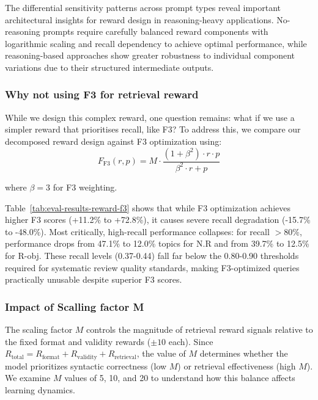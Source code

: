 The differential sensitivity patterns across prompt types reveal important architectural insights for reward design in reasoning-heavy applications. No-reasoning prompts require carefully balanced reward components with logarithmic scaling and recall dependency to achieve optimal performance, while reasoning-based approaches show greater robustness to individual component variations due to their structured intermediate outputs.


\subsubsection{Why not using F3 for retrieval reward}



While we design this complex reward, one question remains: what if we use a simpler reward that prioritises recall, like F3? To address this, we compare our decomposed reward design against F3 optimization using:
\[
F_{\text{F3}}(r, p)  = M \cdot \frac{(1 + \beta^2) \cdot r \cdot p}{\beta^2 \cdot r + p}
\]

where $\beta = 3$ for F3 weighting.

Table~\ref{tab:eval-results-reward-f3} shows that while F3 optimization achieves higher F3 scores (+11.2\% to +72.8\%), it causes severe recall degradation (-15.7\% to -48.0\%). Most critically, high-recall performance collapses: for recall $>80\%$, performance drops from 47.1\% to 12.0\% topics for N.R and from 39.7\% to 12.5\% for R-obj. These recall levels (0.37-0.44) fall far below the 0.80-0.90 thresholds required for systematic review quality standards, making F3-optimized queries practically unusable despite superior F3 scores.

\subsubsection{Impact of Scalling factor M}



The scaling factor $M$ controls the magnitude of retrieval reward signals relative to the fixed format and validity rewards ($\pm 10$ each). Since $R_{\text{total}} = R_{\text{format}} + R_{\text{validity}} + R_{\text{retrieval}}$, the value of $M$ determines whether the model prioritizes syntactic correctness (low $M$) or retrieval effectiveness (high $M$). We examine $M$ values of 5, 10, and 20 to understand how this balance affects learning dynamics.

